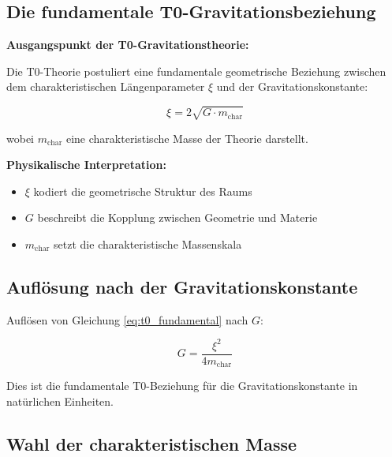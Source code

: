 \documentclass[12pt,a4paper]{article}
\begin{document}
	\subsection{Die fundamentale T0-Gravitationsbeziehung}
	
	\begin{derivation}
		\textbf{Ausgangspunkt der T0-Gravitationstheorie:}
		
		Die T0-Theorie postuliert eine fundamentale geometrische Beziehung zwischen dem charakteristischen L{\"a}ngenparameter $\xi$ und der Gravitationskonstante:
		
		\begin{equation}
			\xi = 2\sqrt{G \cdot m_{\text{char}}}
			\label{eq:t0_fundamental}
		\end{equation}
		
		wobei $m_{\text{char}}$ eine charakteristische Masse der Theorie darstellt.
		
		\textbf{Physikalische Interpretation:}
		\begin{itemize}
			\item $\xi$ kodiert die geometrische Struktur des Raums
			\item $G$ beschreibt die Kopplung zwischen Geometrie und Materie
			\item $m_{\text{char}}$ setzt die charakteristische Massenskala
		\end{itemize}
	\end{derivation}
	
	\subsection{Aufl{\"o}sung nach der Gravitationskonstante}
	
	Aufl{\"o}sen von Gleichung \eqref{eq:t0_fundamental} nach $G$:
	
	\begin{equation}
		\boxed{G = \frac{\xi^2}{4 m_{\text{char}}}}
		\label{eq:g_fundamental}
	\end{equation}
	
	Dies ist die fundamentale T0-Beziehung f{\"u}r die Gravitationskonstante in nat{\"u}rlichen Einheiten.
	
	\subsection{Wahl der charakteristischen Masse}
	
\end{document}
